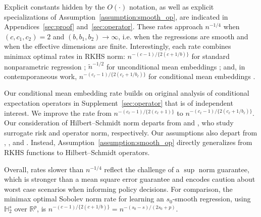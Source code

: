 Explicit constants hidden by the $O(\cdot)$ notation, as well as explicit specializations of Assumption~\ref{assumption:smooth_op}, are indicated in Appendices~\ref{sec:proof} and~\ref{sec:operator}. These rates approach $n^{-1/4}$ when $(c,c_1,c_2)=2$ and $(b,b_1,b_2)\rightarrow \infty$, i.e. when the regressions are smooth and when the effective dimensions are finite. Interestingly, each rate combines minimax optimal rates in RKHS norm: $n^{-(c-1)/\{2(c+1/b)\}}$ for standard nonparametric regression \cite[Theorem 2]{fischer2017sobolev}; $\tilde{n}^{-1/2}$ for unconditional mean embeddings \cite[Theorem 1]{tolstikhin2017minimax}; and, in contemporaneous work, $n^{-(c_{\ell}-1)/\{2(c_{\ell}+1/b_{\ell})\}}$ for conditional mean embeddings \cite[Theorem 3]{li2022optimal}.

\begin{remark}
Our conditional mean embedding rate builds on original analysis of conditional expectation operators in Supplement~\ref{sec:operator} that is of independent interest. We improve the rate from $n^{-(c_{\ell}-1)/\{2(c_{\ell}+1)\}}$ \cite[Theorem 2]{singh2019kernel} to $n^{-(c_{\ell}-1)/\{2(c_{\ell}+1/b_{\ell})\}}$. Our consideration of Hilbert--Schmidt norm departs from \cite{park2020measure} and \cite{talwai2022sobolev}, who study surrogate risk and operator norm, respectively. Our assumptions also depart from \cite[Hypothesis 5]{singh2019kernel}, \cite[Theorem 4.5]{park2020measure}, and \cite[Assumptions 3 and 4]{talwai2022sobolev}. Instead, Assumption~\ref{assumption:smooth_op} directly generalizes \cite[Conditions SRC and EVD]{fischer2017sobolev} from RKHS functions to Hilbert--Schmidt operators.
\end{remark}

Overall, rates slower than $n^{-1/4}$ reflect the challenge of a $\sup$ norm guarantee, which is stronger than a mean square error guarantee and encodes caution about worst case scenarios when informing policy decisions. For comparison, the minimax optimal Sobolev norm rate for learning an $s_0$-smooth regression, using $\mathbb{H}_2^s$ over $\mathbb{R}^p$, is $n^{-(c-1)/\{2(c+1/b)\}}=n^{-(s_0-s)/(2s_0+p)}$.